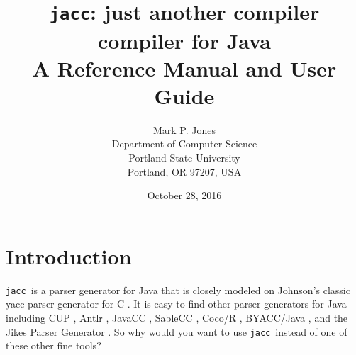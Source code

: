 \documentclass[12pt]{article}
\def\jacc{{\tt jacc}}
\begin{document}
\title{\jacc: just another compiler compiler for Java \\
        A Reference Manual and User Guide}
\author{Mark P. Jones \\
        Department of Computer Science \\
        Portland State University \\
        Portland, OR 97207, USA}
\date{October 28, 2016}
\maketitle

\section{Introduction}
\jacc\ is a parser generator for Java \cite{JLS} that is
closely modeled on Johnson's classic yacc parser generator
for C \cite{Johnson:yacc}.  It is easy to find other
parser generators for Java including CUP \cite{CUP}, Antlr
\cite{Antlr}, JavaCC \cite{JavaCC}, SableCC \cite{SableCC},
Coco/R \cite{CocoR}, BYACC/Java \cite{ByaccJava}, and the
Jikes Parser Generator \cite{JikesPG}.  So why would you
want to use \jacc\ instead of one of these other fine tools?
\end{document}
